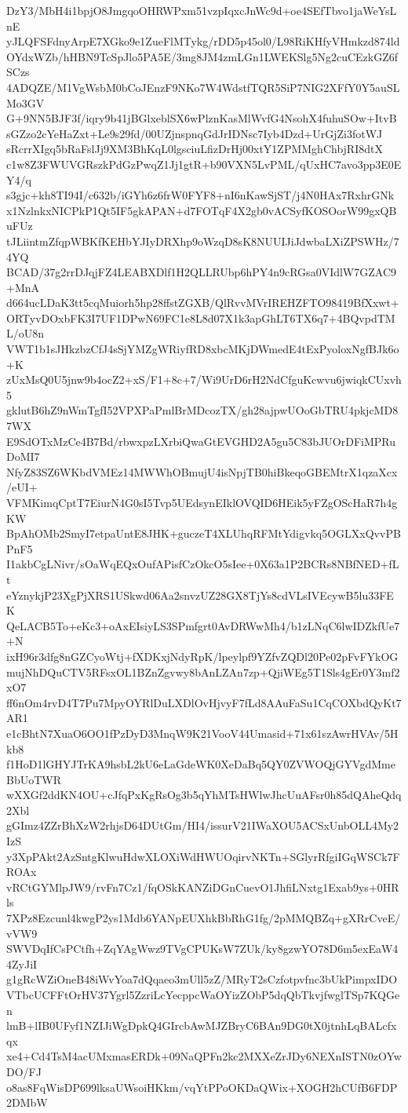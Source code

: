 DzY3/MbH4i1bpjO8JmgqoOHRWPxm51vzpIqxcJnWc9d+oe4SEfTbvo1jaWeYsLnE
yJLQFSFdnyArpE7XGko9e1ZueFlMTykg/rDD5p45ol0/L98RiKHfyVHmkzd874ld
OYdxWZb/hHBN9TcSpJlo5PA5E/3mg8JM4zmLGn1LWEKSlg5Ng2cuCEzkGZ6fSCzs
4ADQZE/M1VgWsbM0bCoJEnzF9NKo7W4WdstfTQR5SiP7NIG2XFfY0Y5auSLMo3GV
G+9NN5BJF3f/iqry9b41jBGlxeblSX6wPlznKasMlWvfG4NsohX4fuhuSOw+ItvB
sGZzo2cYeHaZxt+Le9s29fd/00UZjnspnqGdJrIDNsc7Iyb4Dzd+UrGjZi3fotWJ
sRcrrXIgq5bRaFslJj9XM3BhKqL0lgsciuLfizDrHj00xtY1ZPMMghChbjRI8dtX
c1w8Z3FWUVGRszkPdGzPwqZ1Jj1gtR+b90VXN5LvPML/qUxHC7avo3pp3E0EY4/q
s3gjc+kh8TI94I/c632b/iGYh6z6frW0FYF8+nI6nKawSjST/j4N0HAx7RxhrGNk
x1NzlnkxNICPkP1Qt5IF5gkAPAN+d7FOTqF4X2gb0vACSyfKOSOorW99gxQBuFUz
tJLiintmZfqpWBKfKEHbYJIyDRXhp9oWzqD8sK8NUUIJiJdwbaLXiZPSWHz/74YQ
BCAD/37g2rrDJqjFZ4LEABXDlf1H2QLLRUbp6hPY4n9cRGsa0VIdlW7GZAC9+MnA
d664ucLDaK3tt5cqMuiorh5hp28ffstZGXB/QlRvvMVrIREHZFTO98419BfXxwt+
ORTyvDOxbFK3I7UF1DPwN69FC1e8L8d07X1k3apGhLT6TX6q7+4BQvpdTML/oU8n
VWT1b1sJHkzbzCfJ4sSjYMZgWRiyfRD8xbcMKjDWmedE4tExPyoloxNgfBJk6o+K
zUxMsQ0U5jnw9b4ocZ2+xS/F1+8c+7/Wi9UrD6rH2NdCfguKcwvu6jwiqkCUxvh5
gklutB6hZ9nWmTgfI52VPXPaPmlBrMDcozTX/gh28ajpwUOoGbTRU4pkjcMD87WX
E9SdOTxMzCe4B7Bd/rbwxpzLXrbiQwaGtEVGHD2A5gu5C83bJUOrDFiMPRuDoMI7
NfyZ83SZ6WKbdVMEz14MWWhOBmujU4isNpjTB0hiBkeqoGBEMtrX1qzaXcx/eUI+
VFMKimqCptT7EiurN4G0sI5Tvp5UEdsynEIklOVQID6HEik5yFZgOScHaR7h4gKW
BpAhOMb2SmyI7etpaUntE8JHK+guczeT4XLUhqRFMtYdigvkq5OGLXxQvvPBPnF5
I1akbCgLNivr/sOaWqEQxOufAPisfCzOkcO5sIee+0X63a1P2BCRs8NBfNED+fLt
eYznykjP23XgPjXRS1USkwd06Aa2snvzUZ28GX8TjYs8cdVLsIVEcywB5lu33FEK
QeLACB5To+eKc3+oAxEIsiyLS3SPmfgrt0AvDRWwMh4/b1zLNqC6lwIDZkfUe7+N
ixH96r3dfg8nGZCyoWtj+fXDKxjNdyRpK/lpeylpf9YZfvZQDl20Pe02pFvFYkOG
mujNhDQuCTV5RFsxOL1BZnZgvwy8bAnLZAn7zp+QjiWEg5T1Sls4gEr0Y3mf2xO7
ff6nOm4rvD4T7Pu7MpyOYRlDuLXDlOvHjvyF7fLd8AAuFaSu1CqCOXbdQyKt7AR1
e1cBhtN7XuaO6OO1fPzDyD3MnqW9K21VooV44Umasid+71x61szAwrHVAv/5Hkb8
f1HoD1lGHYJTrKA9hsbL2kU6eLaGdeWK0XeDaBq5QY0ZVWOQjGYVgdMmeBbUoTWR
wXXGf2ddKN4OU+cJfqPxKgRsOg3b5qYhMTsHWlwJhcUuAFsr0h85dQAheQdq2Xbl
gGImz4ZZrBhXzW2rhjsD64DUtGm/HI4/issurV21IWaXOU5ACSxUnbOLL4My2IzS
y3XpPAkt2AzSntgKlwuHdwXLOXiWdHWUOqirvNKTn+SGlyrRfgiIGqWSCk7FROAx
vRCtGYMlpJW9/rvFn7Cz1/fqOSkKANZiDGnCuevO1JhfiLNxtg1Exab9ys+0HRls
7XPz8Ezcunl4kwgP2ys1Mdb6YANpEUXhkBbRhG1fg/2pMMQBZq+gXRrCveE/vVW9
SWVDqIfCsPCtfh+ZqYAgWwz9TVgCPUKsW7ZUk/ky8gzwYO78D6m5exEaW44ZyJiI
g1gRcWZiOneB48iWvYoa7dQqaeo3mUll5zZ/MRyT2sCzfotpvfnc3bUkPimpxIDO
VTbcUCFFtOrHV37Ygrl5ZzriLcYecppcWaOYizZObP5dqQbTkvjfwglTSp7KQGen
lmB+lIB0UFyf1NZIJiWgDpkQ4GIrcbAwMJZBryC6BAn9DG0tX0jtnhLqBALcfxqx
xe4+Cd4TsM4acUMxmasERDk+09NaQPFn2kc2MXXeZrJDy6NEXnISTN0zOYwDO/FJ
o8as8FqWisDP699lksaUWsoiHKkm/vqYtPPoOKDaQWix+XOGH2hCUfB6FDP2DMbW
